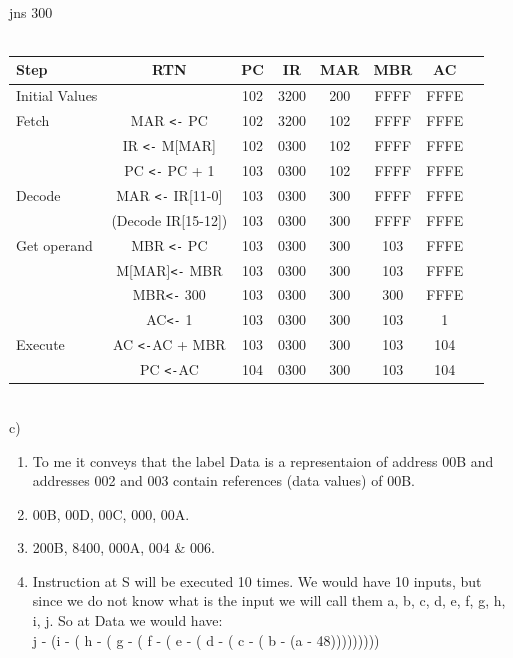 \documentclass{article}
\begin{document}
\\
\\
\\
jns 300
\\
\\
\begin{tabular}{l*{6}{c}r}
Step              & RTN & PC & IR & MAR & MBR  & AC \\
\hline
Initial Values    &     &  102 & 3200 & 200 &  FFFF &  FFFE\\
Fetch            & MAR \verb|<-| PC &  102 & 3200 & 102 &  FFFF &  FFFE\\
                 & IR \verb|<-| M[MAR] &  102 & 0300 & 102 &  FFFF &  FFFE\\
                & PC \verb|<-| PC + 1 & 103 & 0300 & 102 &  FFFF &  FFFE\\
Decode     &  MAR \verb|<-| IR[11-0] & 103 & 0300 & 300 &  FFFF &  FFFE\\
     &  (Decode IR[15-12]) &  103 & 0300 & 300 &  FFFF &  FFFE\\
Get operand &    MBR \verb|<-|  PC& 103 & 0300 & 300 &  103 &  FFFE\\
&    M[MAR]\verb|<-|  MBR& 103 & 0300 & 300 &  103 &  FFFE\\
&  MBR\verb|<-|  300& 103 & 0300 & 300 &  300 &  FFFE\\
&  AC\verb|<-|  1& 103 & 0300 & 300 &  103 &  1\\
Execute &    AC \verb|<-|AC + MBR & 103 & 0300 & 300 &  103 &  104\\
 &    PC \verb|<-|AC & 104 & 0300 & 300 &  103 &  104\\
\end{tabular}
\\
c)
\begin{enumerate}[i]
	\item  To me it conveys that the label Data is a representaion of address 00B and addresses 002 and 003 contain references (data values) of 00B.
		
	\item 00B, 00D, 00C, 000, 00A.
	\item 200B, 8400, 000A, 004 \& 006.
	\item Instruction at S will be executed 10 times. We would have 10 inputs, but since we do not know what is the input we will call them a, b, c, d, e, f, g, h, i, j. So at Data we would have:\\
		j - (i - ( h - ( g - ( f - ( e - ( d - ( c - ( b - (a - 48)))))))))
\end{enumerate}
\end{document}
